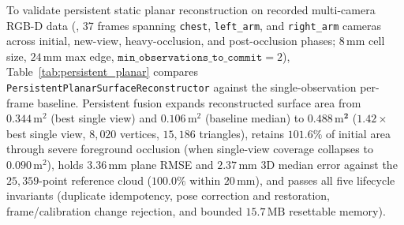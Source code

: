 \documentclass{evidencescene}
\begin{document}
To validate persistent static planar reconstruction on recorded multi-camera RGB-D data (, 37 frames spanning \texttt{chest}, \texttt{left\_arm}, and \texttt{right\_arm} cameras across initial, new-view, heavy-occlusion, and post-occlusion phases; $8\,\mathrm{mm}$ cell size, $24\,\mathrm{mm}$ max edge, $\texttt{min\_observations\_to\_commit}=2$), Table~\ref{tab:persistent_planar} compares \texttt{PersistentPlanarSurfaceReconstructor} against the single-observation per-frame baseline. Persistent fusion expands reconstructed surface area from $0.344\,\mathrm{m}^2$ (best single view) and $0.106\,\mathrm{m}^2$ (baseline median) to $\mathbf{0.488\,\mathrm{m}^2}$ ($1.42\times$ best single view, $8{,}020$ vertices, $15{,}186$ triangles), retains $\mathbf{101.6\%}$ of initial area through severe foreground occlusion (when single-view coverage collapses to $0.090\,\mathrm{m}^2$), holds $3.36\,\mathrm{mm}$ plane RMSE and $2.37\,\mathrm{mm}$ 3D median error against the $25{,}359$-point reference cloud ($100.0\%$ within $20\,\mathrm{mm}$), and passes all five lifecycle invariants (duplicate idempotency, pose correction and restoration, frame/calibration change rejection, and bounded $15.7\,\mathrm{MB}$ resettable memory).

\begin{table}[t]\centering\footnotesize
\caption{Recorded 37-frame multi-camera persistent static planar validation (\texttt{chest}, \texttt{left\_arm}, \texttt{right\_arm}; $8\,\mathrm{mm}$ cell size; archived receipt SHA-256 \texttt{d6285453...}). Persistent fusion preserves geometry across heavy foreground occlusion while extending coverage into new viewpoints.}\label{tab:persistent_planar}
\end{table}
\end{document}
